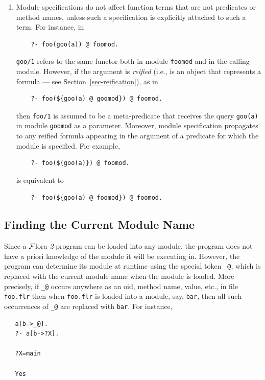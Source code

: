 \documentclass[11pt]{article}
\makeatletter
\newcommand{\thismodule}{{\tt \_@}\xspace}
\newcommand{\FLORA}{{\mbox{\sc ${\cal F}${lora}\rm\emph{-2}}}\xspace}
\makeatother
\begin{document}
\begin{enumerate}
\item Module specifications do not affect function terms that are not
  predicates or method names, unless such a specification is explicitly
  attached to such a term. For instance, in
  \begin{verbatim}
    ?- foo(goo(a)) @ foomod.
  \end{verbatim}
  {\tt goo/1} refers to the same functor both in module {\tt foomod} and in
  the calling module. However, if the argument is \emph{reified} (i.e., is
  an object that represents a formula --- see
  Section~\ref{sec-reification}), as in
  \begin{verbatim}
    ?- foo(${goo(a) @ goomod}) @ foomod.
  \end{verbatim}
  then {\tt foo/1} is assumed to be a meta-predicate that receives the
  query {\tt goo(a)} in module {\tt goomod} as a parameter. Moreover,
  module specification propagates to any reified formula appearing in
  the argument of a predicate for which the module is specified. For example,
  \begin{verbatim}
    ?- foo(${goo(a)}) @ foomod.
  \end{verbatim}
is equivalent to
  \begin{verbatim}
    ?- foo(${goo(a) @ foomod}) @ foomod.
  \end{verbatim}

\end{enumerate}


\subsection{Finding the Current Module Name}

\index{module!\thismodule}
\index{\thismodule}
%
Since a \FLORA program can be loaded into any module, the program does not
have a priori knowledge of the module it will be executing in. However, the
program can determine its module at runtime using the special token
\thismodule, which is replaced with the current module name when the module
is loaded. More precisely, if \thismodule occurs anywhere as an oid, method
name, value, etc., in file {\tt foo.flr} then when {\tt foo.flr} is loaded
into a module, say, {\tt bar}, then all such occurrences of \thismodule are
replaced with {\tt bar}. For instance,
\begin{verbatim}
   a[b->_@].
   ?- a[b->?X].

   ?X=main

   Yes
\end{verbatim}
\end{document}
